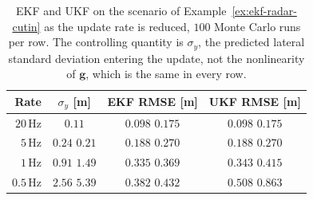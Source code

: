 \documentclass[graybox,envcountchap]{style/SNmono}
\providecommand{\DIFadd}[1]{{\protect\color{blue} #1}} %
\providecommand{\DIFdel}[1]{{\protect\color{red} #1}} %
\providecommand{\DIFaddFL}[1]{\DIFadd{#1}} %
\providecommand{\DIFdelFL}[1]{\DIFdel{#1}} %
\providecommand{\DIFaddbeginFL}{} %
\providecommand{\DIFaddendFL}{} %
\providecommand{\DIFdelbeginFL}{} %
\providecommand{\DIFdelendFL}{} %
\begin{document}
\begin{example}
\begin{table}[!t]
\centering
\small
\caption{EKF and UKF on the scenario of
Example~\ref{ex:ekf-radar-cutin} as the update rate is reduced, $100$ Monte
Carlo runs per row. The controlling quantity is $\sigma_y$, the predicted
lateral standard deviation entering the update, not the nonlinearity of
$\mathbf{g}$, which is the same in every row.}
\label{tab:ekf-ukf-rate}
\begin{tabular}{r c c c}
\hline
\textbf{Rate} & \textbf{$\sigma_y$ [m]} & \textbf{EKF RMSE [m]} & \textbf{UKF RMSE [m]}\\
\hline
$20$\,Hz & $0.11$ & \DIFdelbeginFL \DIFdelFL{$0.098$ }\DIFdelendFL \DIFaddbeginFL \DIFaddFL{$0.175$ }\DIFaddendFL & \DIFdelbeginFL \DIFdelFL{$0.098$}\DIFdelendFL \DIFaddbeginFL \DIFaddFL{$0.175$}\DIFaddendFL \\
$5$\,Hz & \DIFdelbeginFL \DIFdelFL{$0.24$ }\DIFdelendFL \DIFaddbeginFL \DIFaddFL{$0.21$ }\DIFaddendFL & \DIFdelbeginFL \DIFdelFL{$0.188$ }\DIFdelendFL \DIFaddbeginFL \DIFaddFL{$0.270$ }\DIFaddendFL & \DIFdelbeginFL \DIFdelFL{$0.188$}\DIFdelendFL \DIFaddbeginFL \DIFaddFL{$0.270$}\DIFaddendFL \\
$1$\,Hz & \DIFdelbeginFL \DIFdelFL{$0.91$ }\DIFdelendFL \DIFaddbeginFL \DIFaddFL{$1.49$ }\DIFaddendFL & \DIFdelbeginFL \DIFdelFL{$0.335$ }\DIFdelendFL \DIFaddbeginFL \DIFaddFL{$0.369$ }\DIFaddendFL & \DIFdelbeginFL \DIFdelFL{$0.343$}\DIFdelendFL \DIFaddbeginFL \DIFaddFL{$0.415$}\DIFaddendFL \\
$0.5$\,Hz & \DIFdelbeginFL \DIFdelFL{$2.56$ }\DIFdelendFL \DIFaddbeginFL \DIFaddFL{$5.39$ }\DIFaddendFL & \DIFdelbeginFL \DIFdelFL{$0.382$ }\DIFdelendFL \DIFaddbeginFL \DIFaddFL{$0.432$ }\DIFaddendFL & \DIFdelbeginFL \DIFdelFL{$0.508$}\DIFdelendFL \DIFaddbeginFL \DIFaddFL{$0.863$}\DIFaddendFL \\
\hline
\end{tabular}
\end{table}


\end{example}
\end{document}
